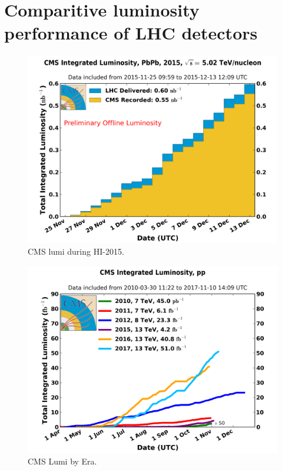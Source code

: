 \section{Comparitive luminosity performance of LHC detectors}

\begin{figure}[h!]
\begin{centering}
\includegraphics[width=6in]{Chapter4/importfigs/int_lumi_per_day_cumulative_pbpb_2015_pbpb.png}
\par\end{centering}
\caption{CMS lumi during HI-2015. \label{fig:lumiHi2015}}
\end{figure}
\begin{figure}[h!]
\begin{centering}
\includegraphics[width=6in]{Chapter4/importfigs/int_lumi_cumulative_pp_2.png}
\par\end{centering}
\caption{CMS Lumi by Era. \label{fig:lumiCMSEra}}
\end{figure}


